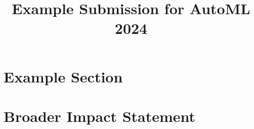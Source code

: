 \documentclass[11pt]{article}
\title{Example Submission for AutoML 2024}
\author[1]{\nameemail{Author 1}{email1@example.com}}
\affil[1]{Institution 1}
\begin{document}
\maketitle

\begin{abstract}
\end{abstract}


\section{Example Section}

\section{Broader Impact Statement}
%
%
%
%
%
\end{document}
